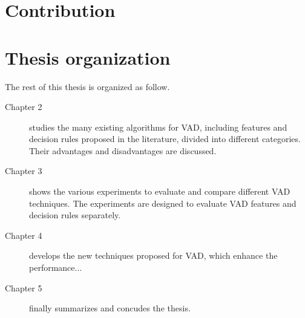 \section{Contribution}

\section{Thesis organization}
The rest of this thesis is organized as follow.

\begin{description}
\item[Chapter 2] studies the many existing algorithms for VAD, including features and decision rules proposed in the literature, divided into different categories. Their advantages and disadvantages are discussed.

\item[Chapter 3] shows the various experiments to evaluate and compare different VAD techniques. The experiments are designed to evaluate VAD features and decision rules separately.

\item[Chapter 4] develops the new techniques proposed for VAD, which enhance the performance...

\item[Chapter 5] finally summarizes and concudes the thesis.
\end{description}

